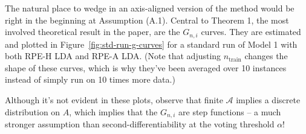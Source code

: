 \documentclass[ejs,preprint]{imsart}
\begin{document}
The natural place to wedge in an axis-aligned version of the method
would be right in the beginning at Assumption (A.1). Central to
Theorem 1, the most involved theoretical result in the paper, are
the $G_{n,i}$ curves. They are estimated and plotted in Figure~\ref{fig:std-run-g-curves}
for a standard run of Model 1 with both RPE-H LDA and RPE-A LDA. (Note
that adjusting $n_{\mathrm{train}}$ changes the shape of these curves,
which is why they've been averaged over 10 instances instead of simply
run on 10 times more data.)

Although it's not evident in these plots, observe that finite $\mathcal{A}$
implies a discrete distribution on $A$, which implies that the $G_{n,i}$
are step functions -- a much stronger assumption than second-differentiability
at the voting threshold $\alpha$!
\end{document}

